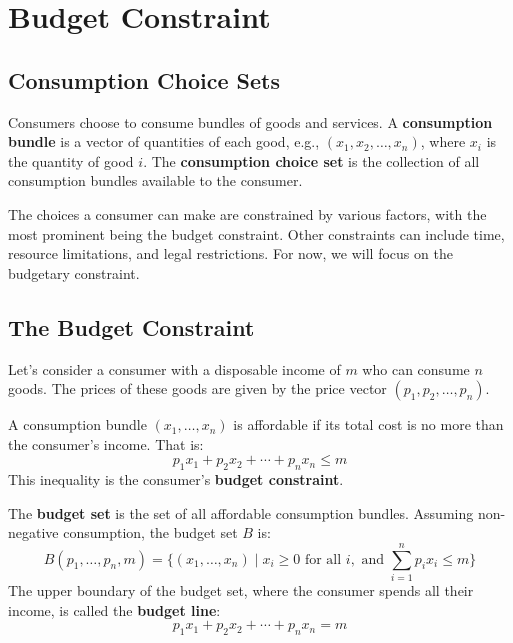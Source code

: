 \chapter{Budget Constraint}\label{chap:budget}

\section{Consumption Choice Sets}

Consumers choose to consume bundles of goods and services. A \textbf{consumption bundle} is a vector of quantities of each good, e.g., $(x_1, x_2, \dots, x_n)$, where $x_i$ is the quantity of good $i$. The \textbf{consumption choice set} is the collection of all consumption bundles available to the consumer.

The choices a consumer can make are constrained by various factors, with the most prominent being the budget constraint. Other constraints can include time, resource limitations, and legal restrictions. For now, we will focus on the budgetary constraint.

\section{The Budget Constraint}

Let's consider a consumer with a disposable income of $m$ who can consume $n$ goods. The prices of these goods are given by the price vector $(p_1, p_2, \dots, p_n)$.

\begin{definition}
A consumption bundle $(x_1, \dots, x_n)$ is affordable if its total cost is no more than the consumer's income. That is:
\begin{equation}
    p_1x_1 + p_2x_2 + \cdots + p_n x_n \leq m
\end{equation}
This inequality is the consumer's \textbf{budget constraint}.
\end{definition}

\begin{definition}
The \textbf{budget set} is the set of all affordable consumption bundles. Assuming non-negative consumption, the budget set $B$ is:
\begin{equation}
    B(p_1, \dots, p_n, m) = \{ (x_1, \dots, x_n) \mid x_i \geq 0 \text{ for all } i, \text{ and } \sum_{i=1}^{n} p_i x_i \leq m \}
\end{equation}
The upper boundary of the budget set, where the consumer spends all their income, is called the \textbf{budget line}:
\begin{equation}
    p_1x_1 + p_2x_2 + \cdots + p_n x_n = m
\end{equation}
\end{definition}

